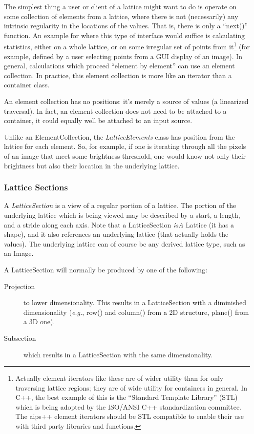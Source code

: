 The simplest thing a user or client of a lattice might want to do is
operate on some collection of elements from a lattice, where there is
not (necessarily) any intrinsic regularity in the locations of the
values. That is, there is only a ``next()'' function. An example for
where this type of interface would suffice is calculating statistics,
either on a whole lattice, or on some irregular set of points from
it\footnote{ Actually element iterators like these are of wider
utility than for only traversing lattice regions; they are of wide
utility for containers in general. In C++, the best example of this is
the ``Standard Template Library'' (STL) which is being adopted by the
ISO/ANSI C++ standardization committee. The {\sc aips++} element
iterators should be STL compatible to enable their use with third
party libraries and functions.}  (for example, defined by a user
selecting points from a GUI display of an image). In general,
calculations which proceed ``element by element'' can use an element
collection. In practice, this element collection is more like an
iterator than a container class.

An element collection has no positions: it's merely a source of values
(a linearized traversal). In fact, an element collection does not need
to be attached to a container, it could equally well be attached to an
input source.

Unlike an ElementCollection, the {\em LatticeElements} class has
position from the lattice for each element. So, for example, if one is
iterating through all the pixels of an image that meet some brightness
threshold, one would know not only their brightness but also their
location in the underlying lattice.

\subsubsection{Lattice Sections}

A {\em LatticeSection} is a view of a regular portion of a
lattice. The portion of the underlying lattice which is being viewed
may be described by a start, a length, and a stride along each
axis. Note that a LatticeSection {\em isA} Lattice (it has a shape),
and it also references an underlying lattice (that actually holds the
values). The underlying lattice can of course be any derived lattice
type, such as an Image.

A LatticeSection will normally be produced by one of the following:
\begin{description}
	\item[Projection] to lower dimensionality. This results
              in a LatticeSection with a
             diminished dimensionality ({\em e.g.}, row() and column()
	     from a 2D structure, plane() from a 3D one).
	\item[Subsection] which results in a LatticeSection with the
              same dimensionality.
\end{description}

